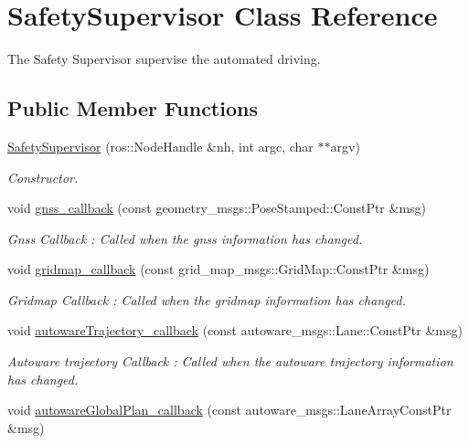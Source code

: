 \hypertarget{classSafetySupervisor}{}\section{Safety\+Supervisor Class Reference}
\label{classSafetySupervisor}


The Safety Supervisor supervise the automated driving.  


\subsection*{Public Member Functions}
\begin{DoxyCompactItemize}
\item 
\hyperlink{classSafetySupervisor_a4f5bd8fd25814a50b61368a444260471}{Safety\+Supervisor} (ros\+::\+Node\+Handle \&nh, int argc, char $\ast$$\ast$argv)
\begin{DoxyCompactList}\small\item\em Constructor. \end{DoxyCompactList}\item 
void \hyperlink{classSafetySupervisor_a3fad879a3b629936c17db22a22269d27}{gnss\+\_\+callback} (const geometry\+\_\+msgs\+::\+Pose\+Stamped\+::\+Const\+Ptr \&msg)
\begin{DoxyCompactList}\small\item\em Gnss Callback \+: Called when the gnss information has changed. \end{DoxyCompactList}\item 
void \hyperlink{classSafetySupervisor_ad2c0a23d1e8b843e6e74ccea633e993c}{gridmap\+\_\+callback} (const grid\+\_\+map\+\_\+msgs\+::\+Grid\+Map\+::\+Const\+Ptr \&msg)
\begin{DoxyCompactList}\small\item\em Gridmap Callback \+: Called when the gridmap information has changed. \end{DoxyCompactList}\item 
void \hyperlink{classSafetySupervisor_a8aa112863eacb33d8d8dfcdf00407c75}{autoware\+Trajectory\+\_\+callback} (const autoware\+\_\+msgs\+::\+Lane\+::\+Const\+Ptr \&msg)
\begin{DoxyCompactList}\small\item\em Autoware trajectory Callback \+: Called when the autoware trajectory information has changed. \end{DoxyCompactList}\item 
void \hyperlink{classSafetySupervisor_a7d3db4d0d050f8dc5af1964050de50b4}{autoware\+Global\+Plan\+\_\+callback} (const autoware\+\_\+msgs\+::\+Lane\+Array\+Const\+Ptr \&msg)
$$
\end{DoxyCompactItemize}
